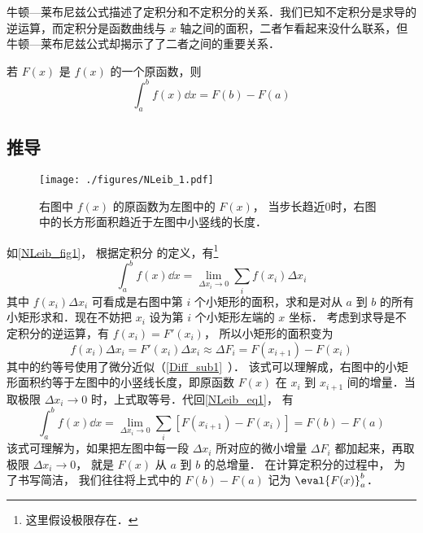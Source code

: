 

牛顿—莱布尼兹公式描述了定积分和不定积分的关系．我们已知不定积分是求导的逆运算，而定积分是函数曲线与 $x$ 轴之间的面积，二者乍看起来没什么联系，但牛顿—莱布尼兹公式却揭示了了二者之间的重要关系．

若 $F(x)$ 是 $f(x)$ 的一个原函数，则
\begin{equation}\label{NLeib_eq1}
\int_a^b f(x) \dd{x}  = F(b) - F(a)
\end{equation}

\subsection{推导}
\begin{figure}[ht]
\centering
\texttt{[image: ./figures/NLeib\_1.pdf]}
\caption{右图中 $f(x)$ 的原函数为左图中的 $F(x)$， 当步长趋近0时，右图中的长方形面积趋近于左图中小竖线的长度．}\label{NLeib_fig1}
\end{figure}

如\autoref{NLeib_fig1}， 根据定积分 的定义，有\footnote{这里假设极限存在．}
\begin{equation}
\int_a^b f(x) \dd{x}= \lim_{\Delta x_i\to 0}\sum_i f(x_i)\Delta x_i
\end{equation}
其中 $f(x_i)\Delta x_i$ 可看成是右图中第 $i$ 个小矩形的面积，求和是对从 $a$ 到 $b$ 的所有小矩形求和．现在不妨把 $x_i$ 设为第 $i$ 个小矩形左端的 $x$ 坐标． 考虑到求导是不定积分的逆运算，有 $f(x_i)=F'(x_i)$， 所以小矩形的面积变为
\begin{equation}
f(x_i)\Delta x_i = F'(x_i)\Delta x_i \approx \Delta F_i = F(x_{i+1})-F(x_i)
\end{equation}
其中的约等号使用了微分近似（\autoref{Diff_sub1}~）． 该式可以理解成，右图中的小矩形面积约等于左图中的小竖线长度，即原函数 $F(x)$ 在 $x_i$ 到 $x_{i+1}$ 间的增量．当取极限 $\Delta x_i \to 0$ 时，上式取等号．代回\autoref{NLeib_eq1}， 有
\begin{equation}
\int_a^b f(x) \dd{x}= \lim_{\Delta x_i\to 0}\sum_i [F(x_{i+1})-F(x_i)] = F(b)-F(a)
\end{equation}
该式可理解为，如果把左图中每一段 $\Delta x_i$ 所对应的微小增量 $\Delta F_i$ 都加起来，再取极限 $\Delta x_i \to 0$， 就是 $F(x)$ 从 $a$ 到 $b$ 的总增量． 在计算定积分的过程中， 为了书写简洁， 我们往往将上式中的 $F(b) - F(a)$ 记为 $\eval{F(x)}_a^b$．

